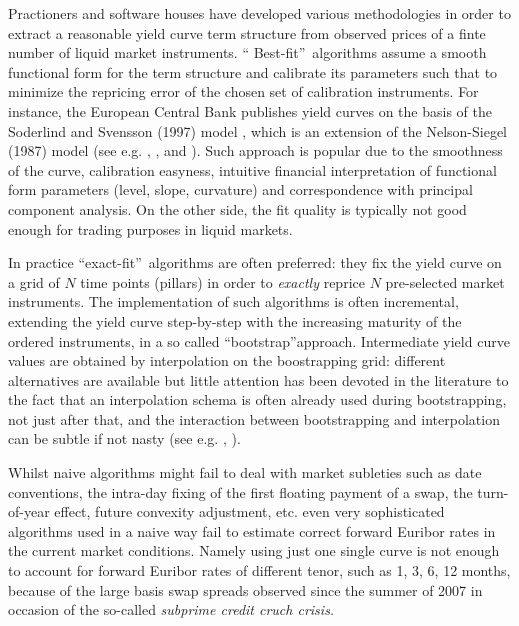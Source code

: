 \documentclass[11pt,reqno]{amsart}
\begin{document}
Practioners and software houses have developed various methodologies in
order to extract a reasonable yield curve term structure from observed
prices of a finte number of liquid market instruments. \textquotedblleft
Best-fit\textquotedblright\ algorithms assume a smooth functional form for
the term structure and calibrate its parameters such that to minimize the
repricing error of the chosen set of calibration instruments. For instance,
the European Central Bank publishes yield curves on the basis of the
Soderlind and Svensson (1997) model \cite{SoderlindSwensson1997}, which is
an extension of the Nelson-Siegel (1987) model (see e.g. \cite{NelsonSiegel}%
, \cite{Diament}, \cite{ChristensenEtAl2007} and \cite{Coroneo2008}). Such
approach is popular due to the smoothness of the curve, calibration
easyness, intuitive financial interpretation of functional form parameters
(level, slope, curvature) and correspondence with principal component
analysis. On the other side, the fit quality is typically not good enough
for trading purposes in liquid markets.

In practice 
\textquotedblleft exact-fit\textquotedblright\ algorithms are often preferred:
they fix the
yield curve on a grid of $N$ time points (pillars) in order to \emph{exactly}
reprice $N$ pre-selected market instruments. The implementation of such
algorithms is often incremental, extending the yield curve step-by-step with
the increasing maturity of the ordered instruments, in a so
called \textquotedblleft bootstrap\textquotedblright approach. Intermediate yield
curve values are obtained by interpolation on the boostrapping grid:
different alternatives are available but little attention has been devoted
in the literature to the fact that an interpolation schema is often already
used during bootstrapping, not just after that, and the interaction between
bootstrapping and interpolation can be subtle if not nasty (see e.g. \cite%
{HaganWest2006}, \cite{HaganWest2008}).

Whilst naive algorithms might fail to deal with market
subleties such as date conventions,
the intra-day fixing of the first floating payment of a swap,
the turn-of-year effect, future convexity adjustment, etc.
even very sophisticated algorithms used in a naive way
fail to estimate correct forward Euribor rates in the current
market conditions. Namely using just one single curve is
not enough to account for forward Euribor rates of different tenor,
such as 1, 3, 6, 12 months, because of the large
basis swap spreads observed since the summer of 2007 in occasion
of the so-called {\it subprime credit cruch crisis.}
\end{document}
